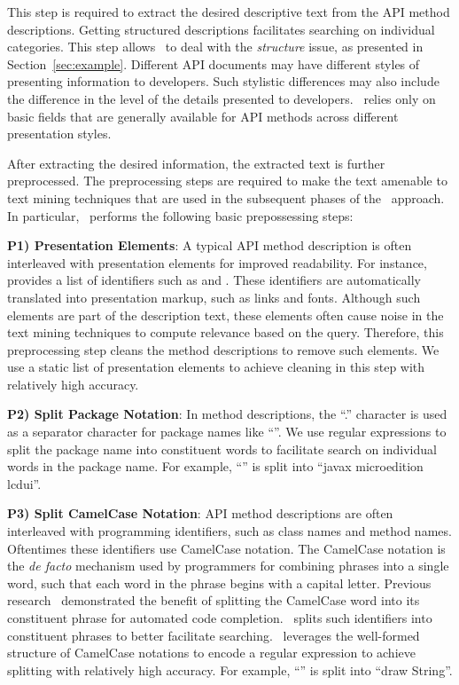 This step is required to extract the desired descriptive text from the API method descriptions.
Getting structured descriptions facilitates searching on individual categories.
This step allows \tool\ to deal with the \textit{structure} issue, as presented in Section~\ref{sec:example}.
Different API documents may have different styles of presenting information to developers.
Such stylistic differences may also include the difference in the level of the details presented to developers.
\tool\ relies only on basic fields that are generally available for API methods across different presentation styles. 

After extracting the desired information, the extracted text is further preprocessed.
The preprocessing steps are required to make the text amenable to text mining techniques
that are used in the subsequent phases of the \tool\ approach.
In particular, \tool\ performs the following basic prepossessing steps: 

\textbf{P1) Presentation Elements}: A typical API method description is often interleaved with presentation elements for improved readability. For instance,  provides a list of identifiers such as   and  . These identifiers are automatically translated into presentation markup, such as links and fonts. Although such elements are part of the description text, these elements often cause noise in the text mining techniques to compute relevance based on the query. Therefore, this preprocessing step cleans the method descriptions to remove such elements. We use a static list of presentation elements to achieve cleaning in this step with relatively high accuracy.
	
\textbf{P2) Split Package Notation}: In method descriptions, the ``.'' character is used as a separator character for package names like ``''. We use regular expressions to split the package name into constituent words to facilitate search on individual words in the package name. For example, ``'' is split into ``javax microedition lcdui''.

\textbf{P3) Split CamelCase Notation}: API method descriptions are often interleaved with programming identifiers, such as class names and method names.
Oftentimes these identifiers use CamelCase notation.
The CamelCase notation is the \textit{de facto} mechanism used by programmers for combining phrases into a single word, such that each word in the phrase begins with a capital letter.
Previous research~\cite{Little2009} demonstrated the benefit of splitting the CamelCase word into its constituent phrase for automated code completion.
\tool\ splits such identifiers into constituent phrases to better facilitate searching.
\tool\ leverages the well-formed structure of CamelCase notations to encode a regular expression to achieve splitting with relatively high accuracy.
For example, ``'' is split into ``draw String''.   

